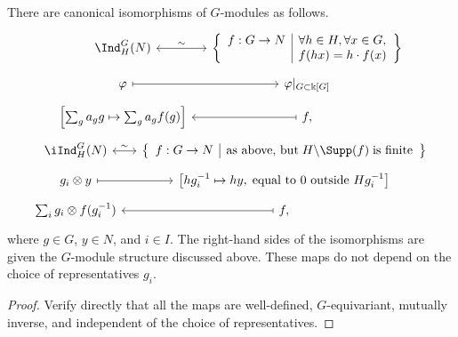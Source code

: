 \begin{lemma}\label{prop:Ind-as-mappings}
	There are canonical isomorphisms of $G$-modules as follows.
	\begin{equation*}\begin{gathered}
		\begin{tikzcd}[column sep=small, row sep=tiny, ampersand replacement=\&]
			\Ind^G_H(N) \arrow[leftrightarrow, r, "\sim"] \& \left\{\begin{array}{r|l}
				f: G \to N & \forall h \in H, \forall x \in G, \\
				& f(hx) = h \cdot f(x)
			\end{array}\right\} \\
			\varphi \arrow[mapsto, r] \& {\varphi|_{G \subset \Bbbk[G]}} \\
			{\left[\sum_g a_g g \mapsto \sum_g a_g f(g)\right]} \& f, \arrow[mapsto, l]
		\end{tikzcd} \\
		\begin{tikzcd}[column sep=small, row sep=tiny, ampersand replacement=\&]
			\iInd^G_H(N) \arrow[leftrightarrow, r, "\sim"] \& \left\{\begin{array}{r|l}
				f: G \to N & \text{as above, but}\; H \backslash \Supp(f) \;\text{is finite}
			\end{array}\right\} \\
			g_i \otimes y \arrow[mapsto, r] \& {\left[ h g_i^{-1} \mapsto h y, \;\text{equal to $0$ outside $Hg_i^{-1}$} \right]} \\
			\sum_i g_i \otimes f(g_i^{-1}) \& f, \arrow[mapsto, l]
		\end{tikzcd}
	\end{gathered}\end{equation*}
	where $g\in G$, $y\in N$, and $i\in I$. The right-hand sides of the
	isomorphisms are given the $G$-module structure discussed above. These
	maps do not depend on the choice of representatives $g_i$.
\end{lemma}
\begin{proof}
	Verify directly that all the maps are well-defined, $G$-equivariant,
	mutually inverse, and independent of the choice of representatives.
\end{proof}

